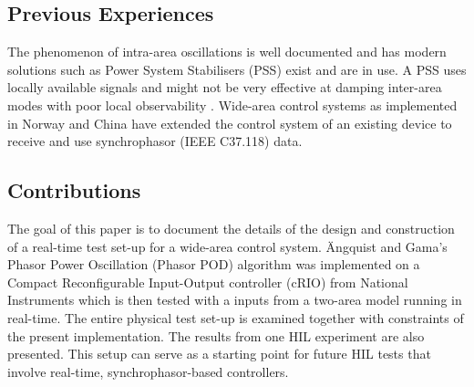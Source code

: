 \documentclass[conference]{IEEEtran}
\begin{document}
\subsection{Previous Experiences}
The phenomenon of intra-area oscillations is well documented and has modern solutions such as Power System Stabilisers (PSS) exist and are in use. A PSS uses locally available signals and might not be very effective at damping inter-area modes with poor local observability \cite{Yuwa}\cite{localREMcomparison}. Wide-area control systems as implemented in Norway \cite{WAPODNorway} and China \cite{WAPODChina} have extended the control system of an existing device to receive and use synchrophasor (IEEE C37.118) data.
\subsection{Contributions}
The goal of this paper is to document the details of the design and construction of a real-time test set-up for a wide-area control system. \"{A}ngquist and Gama's\cite{PhasorPOD} Phasor Power Oscillation (Phasor POD) algorithm was implemented on a Compact Reconfigurable Input-Output controller (cRIO) \cite{cRIO9081} from National Instruments which is then tested with a inputs from a two-area model\cite{KundurTwoArea} running in real-time. The entire physical test set-up is examined together with constraints of the present implementation. The results from one HIL experiment are also presented. This setup can serve as a starting point for future HIL tests that involve real-time, synchrophasor-based controllers.
\end{document}
